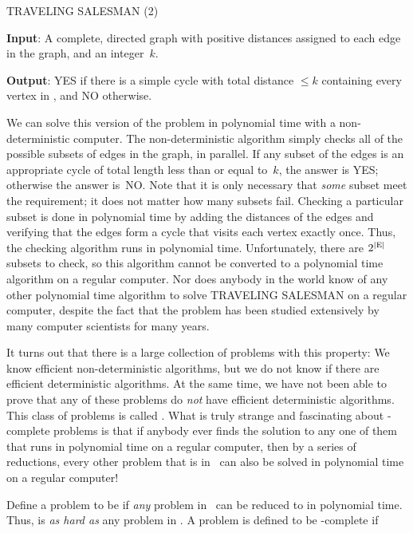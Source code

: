 \begin{inbox}
\noindent TRAVELING SALESMAN (2)

{\bf Input}: A complete, directed graph  with positive
distances assigned to each edge in the graph, and an integer~\(k\).

{\bf Output}: YES if there is a simple cycle with total distance
\(\leq k\) containing every vertex in , and NO otherwise.
\end{inbox}

We can solve this version of the problem in polynomial time with a
non-det\-er\-min\-ist\-ic computer.
The non-deterministic algorithm simply checks all of the possible
subsets of edges in the graph, in parallel.
If any subset of the edges is an appropriate cycle of total length
less than or equal to~\(k\), the answer is YES; otherwise the answer
is~NO.
Note that it is only necessary that \emph{some} subset meet the
requirement; it does not matter how many subsets fail.
Checking a particular subset is done in polynomial time by adding the
distances of the edges and verifying that the edges form a cycle that
visits each vertex exactly once.
Thus, the checking algorithm runs in polynomial time.
Unfortunately, there are \(2^{|{\rm E}|}\) subsets to check, so this
algorithm cannot be converted to a polynomial time algorithm on a
regular computer.
Nor does anybody in the world know of any other polynomial time
algorithm to solve TRAVELING SALESMAN on a regular computer, despite
the fact that the problem has been studied extensively by many
computer scientists for many years.

It turns out that there is a large collection of
problems with this property:
We know efficient non-deterministic algorithms, but we do not know if
there are efficient deterministic algorithms.
At the same time, we have not been able to prove that any of these
problems do \emph{not} have efficient deterministic algorithms.
This class of problems is called .
What is truly strange and fascinating about \NP-complete problems is
that if anybody ever finds the solution to any one of them that runs
in polynomial time on a regular computer, then by a series of
reductions, every other problem that is in \NP\ can also be
solved in polynomial time on a regular computer!

Define a problem to be  if \emph{any} problem in \NP\
can be reduced to  in polynomial time.
Thus,  is \emph{as hard as} any problem in \NP.
A problem \svar{X} is defined to be \NP-complete if

